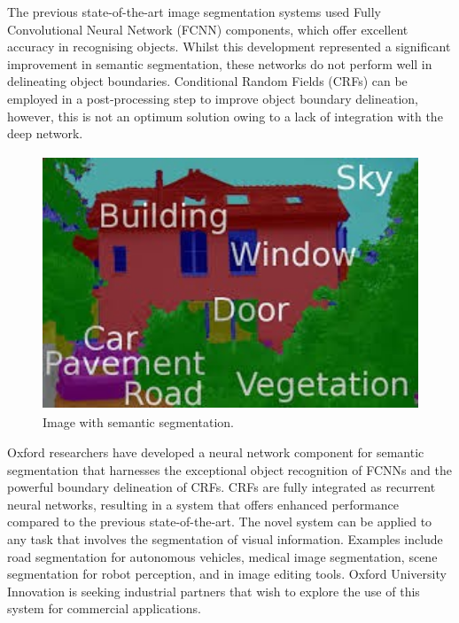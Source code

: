 The previous state-of-the-art image segmentation systems used Fully Convolutional Neural Network (FCNN) components, which offer excellent accuracy in recognising objects. Whilst this development represented a significant improvement in semantic segmentation, these networks do not perform well in delineating object boundaries. Conditional Random Fields (CRFs) can be employed in a post-processing step to improve object boundary delineation, however, this is not an optimum solution owing to a lack of integration with the deep network.
\begin{figure}[H]
  \centering
  \includegraphics[height=3in]{images/semantic.jpg}
   \caption{Image with semantic segmentation.}
\end{figure}
Oxford researchers have developed a neural network component for semantic segmentation that harnesses the exceptional object recognition of FCNNs and the powerful boundary delineation of CRFs. CRFs are fully integrated as recurrent neural networks, resulting in a system that offers enhanced performance compared to the previous state-of-the-art. The novel system can be applied to any task that involves the segmentation of visual information. Examples include road segmentation for autonomous vehicles, medical image segmentation, scene segmentation for robot perception, and in image editing tools. Oxford University Innovation is seeking industrial partners that wish to explore the use of this system for commercial applications.
